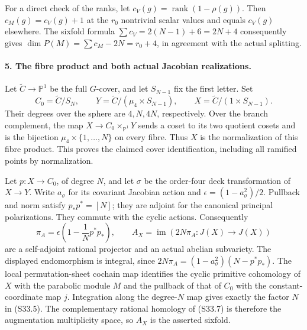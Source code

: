 For a direct check of the ranks, let \(c_V(g)=\operatorname{rank}(1-\rho(g))\).
Then \(c_M(g)=c_V(g)+1\) at the \(r_0\) nontrivial scalar
values and equals \(c_V(g)\) elsewhere. The sixfold formula
\(\sum c_V=2(N-1)+6=2N+4\) consequently gives
\(\dim P(M)=\sum c_M-2N=r_0+4\), in agreement with the
actual splitting.

\paragraph{5. The fibre product and both actual Jacobian realizations.}
Let \(\widetilde C\to\mathbb P^1\) be the full \(G\)-cover,
and let \(S_{N-1}\) fix the first letter. Set
\[
 C_0=\widetilde C/S_N,\qquad
 Y=\widetilde C/(\mu_4\times S_{N-1}),\qquad
 X=\widetilde C/(1\times S_{N-1}).
\]
Their degrees over the sphere are \(4,N,4N\), respectively.
Over the branch complement, the map
\(X\to C_0\times_{\mathbb P^1}Y\) sends a coset to its two
quotient cosets and is the bijection
\(\mu_4\times\{1,\ldots,N\}\) on every fibre. Thus \(X\)
is the normalization of this fibre product. This proves the claimed
cover identification, including all ramified points by normalization.

Let \(p:X\to C_0\), of degree \(N\), and let \(\sigma\)
be the order-four deck transformation of \(X\to Y\).
Write \(a_\sigma\) for its covariant Jacobian action and
\(\epsilon=(1-a_\sigma^2)/2\). Pullback and norm satisfy
\(p_*p^*=[N]\); they are adjoint for the canonical principal
polarizations. They commute with the cyclic actions. Consequently
\[
 \pi_A=\epsilon\left(1-\frac1N p^*p_*\right),\qquad
 A_X=\operatorname{im}(2N\pi_A:J(X)\to J(X))
 \tag{S33.7}
\]
are a self-adjoint rational projector and an actual abelian
subvariety. The displayed endomorphism is integral, since
\(2N\pi_A=(1-a_\sigma^2)(N-p^*p_*)\).
The local permutation-sheet cochain map identifies the cyclic
primitive cohomology of \(X\) with the parabolic module \(M\)
and the pullback of that of \(C_0\) with the constant-coordinate
map \(j\). Integration along the degree-\(N\) map gives exactly
the factor \(N\) in (S33.5). The complementary rational homology
of (S33.7) is therefore the augmentation multiplicity space, so
\(A_X\) is the asserted sixfold.

